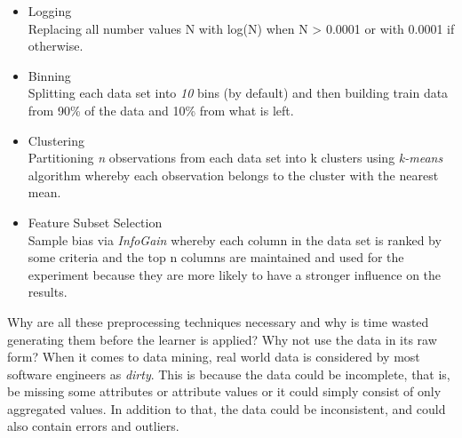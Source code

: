 \documentclass{sig-alternate}
\begin{document}
\begin{itemize}
\item{Logging}
\\Replacing all number values N with log(N) when N > 0.0001 or with 0.0001 if otherwise.
\item{Binning}
\\Splitting each data set into {\em 10} bins (by default) and then building train data from 90\% of the data and 10\% from what is left.
\item{Clustering}
\\Partitioning {\em n} observations from each data set into k clusters using {\em k-means} algorithm whereby each observation belongs to the cluster with the nearest mean.
\item{Feature Subset Selection}
\\Sample bias via {\em InfoGain} whereby each column in the data set is ranked by some criteria and the top n columns are maintained and used for the experiment because they are more likely to have a stronger influence on the results.
\end{itemize}
Why are all these preprocessing techniques necessary and why is time wasted generating them before the learner is applied? Why not use the data in its raw form? When it comes to data mining, real world data is considered by most software engineers as {\em dirty}. This is because the data could be incomplete, that is, be missing some attributes or attribute values or it could simply consist of only aggregated values. In addition to that, the data could be inconsistent, and could also contain errors and outliers.
\end{document}
